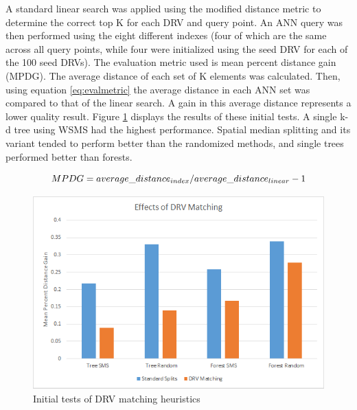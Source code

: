 A standard linear search was applied using the modified distance metric to determine the correct top K for each DRV and query point.  An ANN query was then performed using the eight different indexes (four of which are the same across all query points, while four were initialized using the seed DRV for each of the 100 seed DRVs).  The evaluation metric used is mean percent distance gain (MPDG).  The average distance of each set of K elements was calculated.  Then, using equation \ref{eq:evalmetric} the average distance in each ANN set was compared to that of the linear search.  A gain in this average distance represents a lower quality result.  Figure \ref{fig:drvmatching} displays the results of these initial tests.  A single k-d tree using WSMS had the highest performance.  Spatial median splitting and its variant tended to perform better than the randomized methods, and single trees performed better than forests.

\begin{equation}
\label{eq:evalmetric}
MPDG = average\_distance_{index} / average\_distance_{linear} - 1 \\
\end{equation}

\begin{figure}[h]
\begin{center}
\includegraphics[width=\textwidth]{Figures/sysdesc_drvmatching}
\end{center}
\caption{Initial tests of DRV matching heuristics}
\label{fig:drvmatching}
\end{figure}


